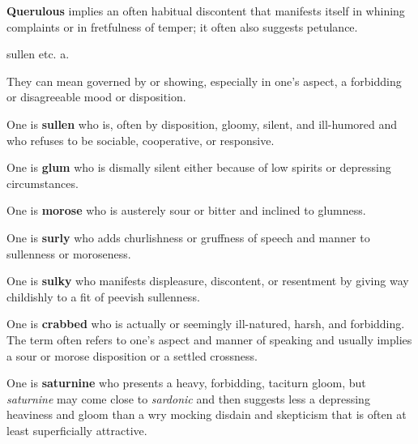 \begin{description}[style=unboxed]
\begin{mynewitemize}
\item \textbf{Querulous} implies an often habitual discontent that manifests
itself in whining complaints or in fretfulness of temper; it often also suggests
petulance.

\end{mynewitemize}


        {sullen etc.} a.

\begin{mynewitemize}
\item They can mean governed by or showing, especially in one's aspect, a 
forbidding or disagreeable mood or disposition.

\item One is \textbf{sullen} who is, often by disposition, gloomy, silent, and 
ill-humored and who refuses to be sociable, cooperative, or responsive.

\item One is \textbf{glum} who is dismally silent either because of low spirits
or depressing circumstances.

\item One is \textbf{morose} who is austerely sour or bitter and inclined 
to glumness.

\item One is \textbf{surly} who adds churlishness or gruffness of speech and 
manner to sullenness or moroseness.

\item One is \textbf{sulky} who manifests displeasure, discontent, or resentment
by giving way childishly to a fit of peevish sullenness.

\item One is \textbf{crabbed} who is actually or seemingly ill-natured, harsh,
and forbidding. The term often refers to one's aspect and manner of speaking 
and usually implies a sour or morose disposition or a settled crossness.

\item One is \textbf{saturnine} who presents a heavy, forbidding, taciturn 
gloom, but \textit{saturnine} may come close to \textit{sardonic} and then
suggests less a depressing heaviness and gloom than a wry mocking disdain and 
skepticism that is often at least superficially attractive.


\end{mynewitemize}
\end{description}
